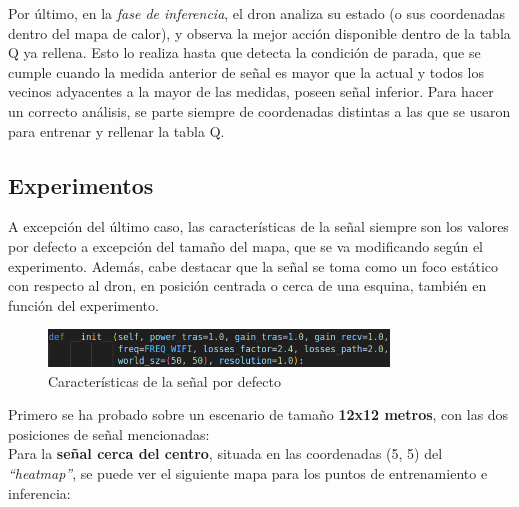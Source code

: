 Por último, en la \emph{fase de inferencia}, el dron analiza su estado (o sus coordenadas dentro del mapa de calor), y observa la mejor acción disponible dentro de la tabla Q ya rellena. Esto lo realiza hasta que detecta la condición de parada, que se cumple cuando la medida anterior de señal es mayor que la actual y todos los vecinos adyacentes a la mayor de las medidas, poseen señal inferior. Para hacer un correcto análisis, se parte siempre de coordenadas distintas a las que se usaron para entrenar y rellenar la tabla Q.

\subsection{Experimentos}
\label{subsec:experimentos_sf}

A excepción del último caso, las características de la señal siempre son los valores por defecto a excepción del tamaño del mapa, que se va modificando según el experimento. Además, cabe destacar que la señal se toma como un foco estático con respecto al dron, en posición centrada o cerca de una esquina, también en función del experimento.\\

\begin{figure} [H]
    \begin{center}
    \includegraphics[height=1cm]{imagenes/cap4/16_default_values.png}
    \end{center}
    \caption[Características de la señal por defecto]{Características de la señal por defecto}
    \label{fig:compare_graph}
\end{figure}

Primero se ha probado sobre un escenario de tamaño \textbf{12x12 metros}, con las dos posiciones de señal mencionadas:\\

Para la \textbf{señal cerca del centro}, situada en las coordenadas (5, 5) del \emph{``heatmap''}, se puede ver el siguiente mapa para los puntos de entrenamiento e inferencia:\\

